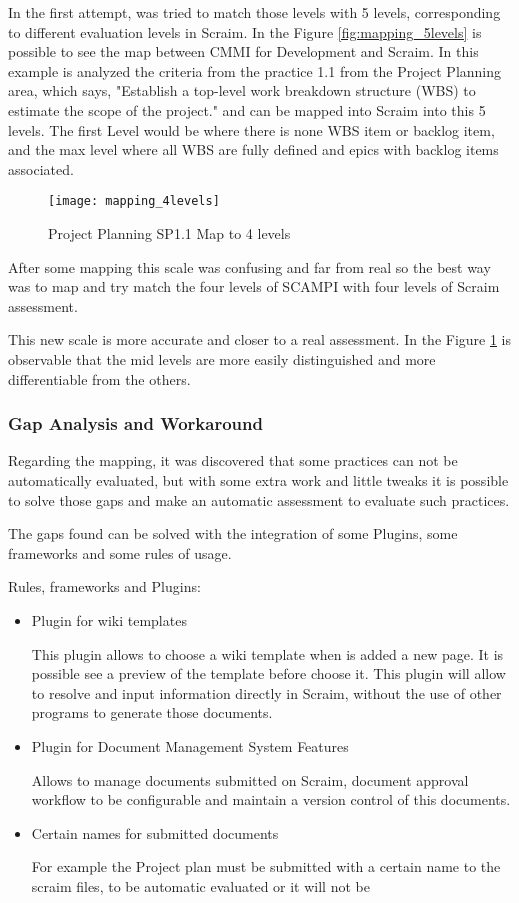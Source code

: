 In the first attempt, was tried to match those levels with 5 levels, corresponding to different evaluation levels in Scraim. In the Figure \ref{fig:mapping_5levels} is possible to see the map between CMMI for Development and Scraim. In this example is analyzed the criteria from the practice 1.1 from the Project Planning area, which says, "Establish a top-level work breakdown structure (WBS) to estimate the scope of the project." and can be mapped into Scraim into this 5 levels. The first Level would be where there is none WBS item or backlog item, and the max level where all WBS are fully defined and epics with backlog items associated. 

\begin{figure}[h]
	\begin{center}
		\leavevmode
		\texttt{[image: mapping\_4levels]}
		\caption{Project Planning SP1.1 Map to 4 levels}
		\label{fig:mapping_4levels}
	\end{center}
\end{figure}

After some mapping this scale was confusing and far from real so the best way was to map and try match the four levels of SCAMPI with four levels of Scraim assessment.

This new scale is more accurate and closer to a real assessment. In the Figure \ref{fig:mapping_4levels} is observable that the mid levels are more easily distinguished and more differentiable from the others. 

\subsubsection{Gap Analysis and Workaround}
Regarding the mapping, it was discovered  that some practices can not be automatically evaluated, but with some extra work and little tweaks it is possible to solve those gaps and make an automatic assessment to evaluate such practices.

The gaps found can be solved with the integration of some Plugins, some frameworks and some rules of usage.

Rules, frameworks and Plugins:
\begin{itemize}
	\item Plugin for wiki templates
	
	This plugin allows to choose a wiki template when is added a new page. It is possible see a preview of the template before choose it.
	This plugin will allow to resolve and input information directly in Scraim, without the use of other programs to generate those documents.
	
	\item Plugin for Document Management System Features
	
	Allows to manage documents submitted on Scraim, document approval workflow to be configurable and maintain a version control of this documents.
	
	\item Certain names for submitted documents
	
	For example the Project plan must be submitted with a certain name to the scraim files, to be automatic evaluated or it will not be 
	
\end{itemize}